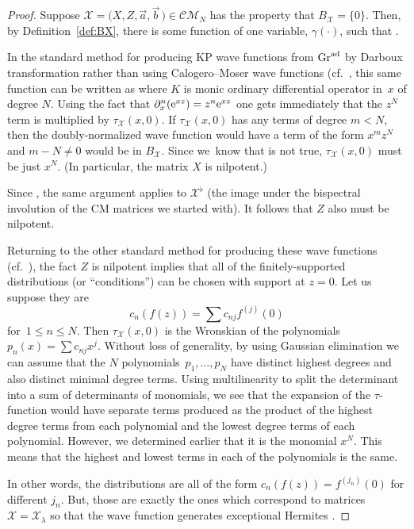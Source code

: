 \documentclass[pdftex]{sigma}
\numberwithin{equation}{section}
\theoremstyle{definition}
\def\X{\mathcal{X}}
\def\CM{\mathcal{C\!M}}
\begin{document}
 \begin{proof}
Suppose $\X=\bigl(X,Z,\vec a,\vec b\,\bigr)\in\CM_N$ has the property that
$B_{\X}=\{0\}$.
Then, by Definition~\ref{def:BX},
there is some function of one variable, $\gamma(\cdot)$, such that
\smash{$
\hat{\hat\psi}_{\X}(x,0,z)=\gamma(xz)$}.

In the standard method for producing KP wave functions from ${\rm Gr}^{\rm ad}$ by Darboux
transformation rather than using Calogero--Moser wave functions
(cf.~\cite{cmbis,WilsonBisp}, this same function can be written as
\smash{$
\hat{\hat\psi}_{\X}(x,0,z)=\tau_{\X}(x,0) K({\rm e}^{xz})
$}
where $K$ is monic ordinary differential operator in~$x$ of degree
$N$. Using the fact that $\partial_x^n({\rm e}^{xz})=z^n{\rm e}^{xz}$ one gets
immediately that the $z^N$ term is multiplied by $\tau_{\X}(x,0)$.
If $\tau_{\X}(x,0)$ has any terms of degree $m<N$, then the
doubly-normalized wave function would have a term of the form $x^mz^N$
and $m-N\not=0$ would be in $B_{\X}$. Since we~know that is not true,
$\tau_{\X}(x,0)$ must be just $x^N$. (In particular, the matrix $X$
is nilpotent.)

Since \smash{$\hat{\hat\psi}_{\X}^{\flat}(x,0,z)=\hat{\hat\psi}_{\X}(z,0,x)$},
 the same argument applies to $\X^{\flat}$ (the image under the
 bispectral involution of the CM matrices we started with). It
 follows that $Z$ also must be nilpotent.

Returning to the other standard method for producing these wave
functions (cf.~\cite{cmbis,WilsonBisp}), the fact $Z$ is nilpotent
implies that all of the finitely-supported distributions (or ``conditions'') can be chosen with support at
$z=0$. Let us suppose they are
\[
c_n(f(z))=\sum c_{nj} f^{(j)}(0)\] for~${1\leq n\leq N}$.
Then $\tau_{\X}(x,0)$ is the Wronskian of the polynomials $p_n(x)=\sum c_{nj}x^j$.
Without loss of generality, by using Gaussian elimination we
can assume that the $N$ polynomials~${p_1,\ldots,p_N}$ have distinct
highest degrees and also distinct minimal degree terms. Using
multilinearity to split the determinant into a sum of determinants of
monomials, we see that the expansion of the $\tau$-function would have
separate terms produced as the product of the highest degree terms
from each polynomial and the lowest degree terms of each polynomial.
However, we determined earlier that it is the monomial $x^N$. This
means that the highest and lowest terms in each of the polynomials is
the same.

In other words, the distributions are all of the form
$c_n(f(z))=f^{(j_n)}(0)$ for different $j_n$. But, those are exactly
the ones which correspond to matrices $\X=\X_{\lambda}$ so that the
wave function generates exceptional Hermites \cite{PThesis,PalusoKasman,WilsonCM}.
 \end{proof}
\end{document}
